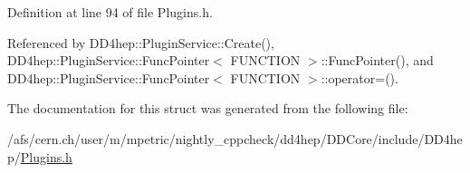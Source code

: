 Definition at line 94 of file Plugins.h.

Referenced by DD4hep::PluginService::Create(), DD4hep::PluginService::FuncPointer$<$ FUNCTION $>$::FuncPointer(), and DD4hep::PluginService::FuncPointer$<$ FUNCTION $>$::operator=().

The documentation for this struct was generated from the following file:\begin{DoxyCompactItemize}
\item 
/afs/cern.ch/user/m/mpetric/nightly\_\-cppcheck/dd4hep/DDCore/include/DD4hep/\hyperlink{_plugins_8h}{Plugins.h}\end{DoxyCompactItemize}

